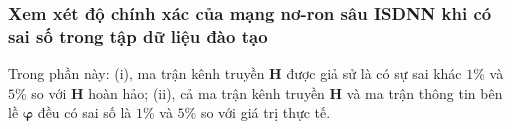 \subsubsection*{\textbf{Xem xét độ chính xác của mạng nơ-ron sâu ISDNN khi có sai số trong tập dữ liệu đào tạo}}
Trong phần này: (i), ma trận kênh truyền $\mathbf{H}$ được giả sử là có sự sai khác $1$\% và $5$\% so với $\mathbf{H}$ hoàn hảo; (ii), cả ma trận kênh truyền $\mathbf{H}$ và ma trận thông tin bên lề ${\boldsymbol{\varphi}}$ đều có sai số là $1$\% và $5$\% so với giá trị thực tế. 

